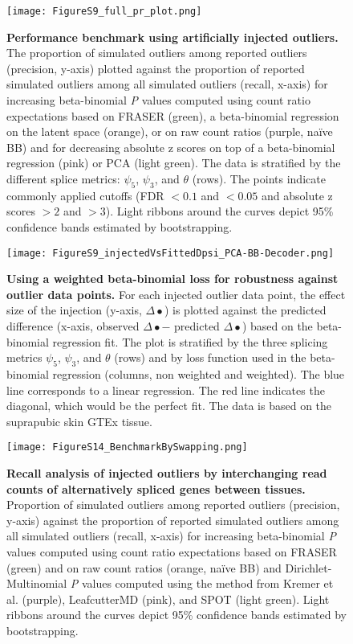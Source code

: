 \documentclass[a4paper,12pt]{article}
\begin{document}
\begin{figure}[h]
	\centering
	\texttt{[image: FigureS9\_full\_pr\_plot.png]}
	\caption{
	    \textbf{Performance benchmark using artificially injected outliers.} 
The proportion of simulated outliers among reported outliers (precision, y-axis)
plotted against the proportion of reported simulated outliers among all 
simulated outliers (recall, x-axis) for increasing beta-binomial \textit{P} values 
computed using count ratio expectations based on FRASER (green), 
a beta-binomial regression on the latent space (orange), or on raw count 
ratios (purple, na\"ive BB) and for decreasing absolute z scores on top of 
a beta-binomial regression (pink) or PCA (light green). The data is stratified 
by the different splice metrics: $\psi_5$, $\psi_3$, and $\theta$ (rows). The points indicate commonly 
applied cutoffs (FDR $< 0.1$ and $< 0.05$ and absolute z scores $>2$ and $>3$). 
Light ribbons around the curves depict 95\% confidence bands estimated by bootstrapping.
}
\end{figure}
\pagebreak


\begin{figure}[h]
\centering
	\texttt{[image: FigureS9\_injectedVsFittedDpsi\_PCA-BB-Decoder.png]}
	\caption{
	    \textbf{Using a weighted beta-binomial loss for robustness against outlier data points.}
For each injected outlier data point, the effect size of the injection 
(y-axis, $\Delta\bullet$) is plotted against the predicted difference 
(x-axis, observed $\Delta\bullet -$ predicted $\Delta\bullet$) based on the beta-binomial 
regression fit. The plot is stratified by the three splicing metrics $\psi_5$,
$\psi_3$, and $\theta$ (rows) and by loss function used in the beta-binomial 
regression (columns, non weighted and weighted). The blue line corresponds to a 
linear regression. The red line indicates the diagonal, which would be the 
perfect fit. The data is based on the suprapubic skin GTEx tissue.
}
\end{figure}
\pagebreak


\begin{figure}[h]
\centering
	\texttt{[image: FigureS14\_BenchmarkBySwapping.png]}
	\caption{
	    \textbf{Recall analysis of injected outliers by interchanging read counts of alternatively spliced genes between tissues.}
	    Proportion of simulated outliers among reported outliers 
(precision, y-axis) against the proportion of reported simulated 
outliers among all simulated outliers (recall, x-axis) for 
increasing beta-binomial \textit{P} values computed using count ratio 
expectations based on FRASER (green) and on raw count ratios (orange, na\"ive BB) 
and Dirichlet-Multinomial \textit{P} values computed using the method from 
Kremer et al. (purple), LeafcutterMD (pink), and SPOT (light green). Light ribbons around the curves 
depict 95\% confidence bands estimated by bootstrapping.
}
\end{figure}
\pagebreak
\end{document}
